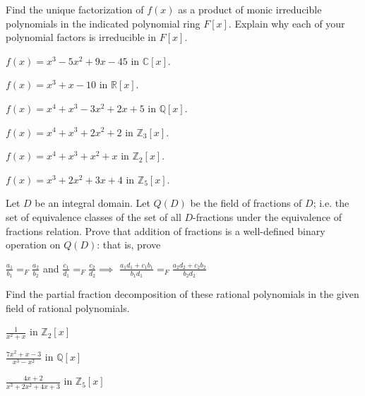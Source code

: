 \documentclass[12pt]{article}
\newcommand{\Z}{\mathbb{Z}}
\newcommand{\R}{\mathbb{R}}
\newcommand{\Q}{\mathbb{Q}}
\newcommand{\C}{\mathbb{C}}
\newenvironment{question}[2][Question]{\begin{trivlist}
\item[\hskip \labelsep {\bfseries #1}\hskip \labelsep {\bfseries #2.}]}{\end{trivlist}}
\begin{document}
\begin{question}{3}
Find the unique factorization of $f(x)$ as a product of monic irreducible polynomials
in the indicated polynomial ring $F[x]$. Explain why each of your polynomial factors is
irreducible in $F[x]$.

\begin{question}{3a} $f(x) = x^3 - 5x^2 + 9x - 45$ in $\C[x]$.
\end{question}
\begin{question}{3b} $f(x) = x^3 + x - 10$ in $\R[x]$.
\end{question}
\begin{question}{3c} $f(x) = x^4 + x^3 - 3x^2 + 2x + 5$ in $\Q[x]$.
\end{question}
\begin{question}{3d} $f(x) = x^4 + x^3 + 2x^2 + 2$ in $\Z_3[x]$.
\end{question}
\begin{question}{3e} $f(x) = x^4 + x^3 + x^2 + x$ in $\Z_2[x]$.
\end{question}
\begin{question}{3f} $f(x) = x^3 + 2x^2 + 3x + 4$ in $\Z_5[x]$.
\end{question}

\end{question}
\begin{question}{4}
Let $D$ be an integral domain. Let $Q(D)$ be the field of fractions of $D$; i.e. the set of
equivalence classes of the set of all $D$-fractions under the equivalence of fractions relation.
Prove that addition of fractions is a well-defined binary operation on $Q(D)$: that is, prove

$\frac{a_1}{b_1} =_F \frac{a_2}{b_2}$ and 
$\frac{c_1}{d_1} =_F \frac{c_2}{d_2} \implies$
$\frac{a_1d_1 + c_1b_1}{b_1d_1} =_F \frac{a_2d_2 + c_2b_2}{b_2d_2}$

\end{question}

\begin{question}{5}
 Find the partial fraction decomposition of these rational polynomials in the given field
of rational polynomials.
\end{question}

\begin{question}{5a} $\frac{1}{x^2+x}$ in $\Z_2[x]$
\end{question}
\begin{question}{5b} $\frac{7x^2+x-3}{x^3-x^2}$ in $\Q[x]$
\end{question}
\begin{question}{5c} $\frac{4x+2}{x^3+2x^2+4x+3}$ in $\Z_5[x]$
\end{question}
\end{document}
